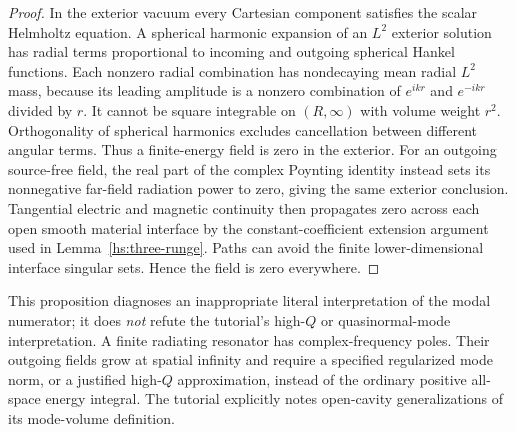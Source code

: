 \begin{proof}
In the exterior vacuum every Cartesian component satisfies the
scalar Helmholtz equation.  A spherical harmonic expansion of an
$L^2$ exterior solution has radial terms proportional to incoming
and outgoing spherical Hankel functions.  Each nonzero radial
combination has nondecaying mean radial $L^2$ mass, because its
leading amplitude is a nonzero combination of $e^{ikr}$ and
$e^{-ikr}$ divided by $r$.  It cannot be square integrable on
$(R,\infty)$ with volume weight $r^2$.  Orthogonality of spherical
harmonics excludes cancellation between different angular terms.
Thus a finite-energy field is zero in the exterior.
For an outgoing source-free field, the real part of the complex
Poynting identity instead sets its nonnegative far-field radiation
power to zero, giving the same exterior conclusion.
Tangential electric and magnetic continuity then propagates zero
across each open smooth material interface by the constant-coefficient
extension argument used in Lemma~\ref{hs:three-runge}.
Paths can avoid the finite lower-dimensional interface singular sets.
Hence the field is zero everywhere.
\end{proof}

This proposition diagnoses an inappropriate literal interpretation
of the modal numerator; it does \emph{not} refute the tutorial's
high-$Q$ or quasinormal-mode interpretation.  A finite radiating
resonator has complex-frequency poles.  Their outgoing fields grow
at spatial infinity and require a specified regularized mode norm,
or a justified high-$Q$ approximation, instead of the ordinary
positive all-space energy integral.  The tutorial explicitly notes
open-cavity generalizations of its mode-volume definition.

